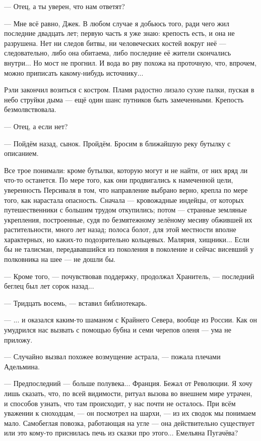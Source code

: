 --- Отец, а ты уверен, что нам ответят?

--- Мне всё равно, Джек. В любом случае я добьюсь того, ради чего жил последние двадцать лет;
первую часть я уже знаю: крепость есть, и она не разрушена. Нет ни следов битвы, ни человеческих костей вокруг неё ---
следовательно, либо она обитаема, либо последние её жители скончались внутри... Но мост не прогнил.
И вода во рву похожа на проточную, что, впрочем, можно приписать какому-нибудь источнику...

Рэли закончил возиться с костром. Пламя радостно лизало сухие палки, пуская в небо струйки дыма ---
ещё один шанс путников быть замеченными. Крепость безмолвствовала.

--- Отец, а если нет?

--- Пойдём назад, сынок. Пройдём. Бросим в ближайшую реку бутылку с описанием.

Все трое понимали: кроме бутылки, которую могут и не найти, от них вряд ли что-то останется.
По мере того, как они продвигались к намеченной цели, уверенность Персиваля в том, что направление выбрано верно,
крепла по мере того, как нарастала опасность.
Сначала --- кровожадные индейцы, от которых путешественники с большим трудом откупились;
потом --- странные земляные укрепления, построенные, судя по безмятежному зелёному месиву обжившей их растительности,
много лет назад; полоса болот, для этой местности вполне характерных, но каких-то подозрительно кольцевых.
Малярия, хищники... Если бы не талисман, передававшийся из поколения в поколение и сейчас висевший у полковника на шее ---
не дошли бы.

\emptypar

--- Кроме того, --- почувствовав поддержку, продолжал Хранитель, --- последний беглец был лет сорок назад...

--- Тридцать восемь, --- вставил библиотекарь.

--- ... и оказался каким-то шаманом с Крайнего Севера, вообще из России.
Как он умудрился нас вызвать с помощью бубна и семи черепов оленя --- ума не приложу.

--- Случайно вызвал похожее возмущение астрала, --- пожала плечами Адельмина.

--- Предпоследний --- больше полувека... Франция. Бежал от Революции.
Я хочу лишь сказать, что, по всей видимости, ритуал вызова во внешнем мире утрачен, и способов узнать, что там происходит,
у нас почти не осталось. При всём уважении к сноходцам, --- он посмотрел на шархи,
--- из их сводок мы понимаем мало. Самобеглая повозка, работающая на угле
--- она действительно существует или это кому-то приснилась печь из сказки про этого... Емельяна Пугачёва?

